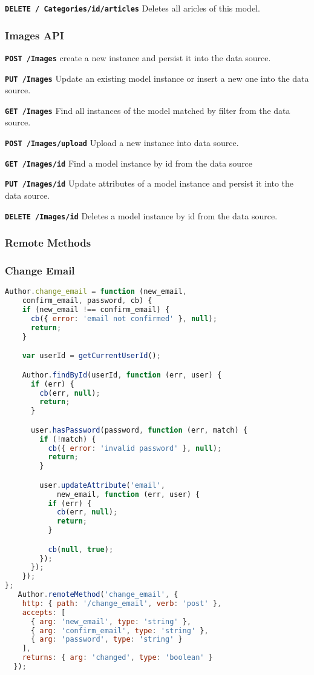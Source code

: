 \texttt{\textbf{DELETE / Categories/{id}/articles}} Deletes all aricles of this model.


\subsubsection{Images API}

\texttt{\textbf{POST /Images}} create a new instance and persist it into the data source.

\texttt{\textbf{PUT /Images}} Update an existing model instance or insert a new one into the data source.

\texttt{\textbf{GET /Images}} Find all instances of the model matched by filter from the data source.

\texttt{\textbf{POST /Images/upload}} Upload a new instance into data source.

\texttt{\textbf{GET /Images/{id}}} Find a model instance by id from the data source

\texttt{\textbf{PUT /Images/{id}}} Update attributes of a model instance and persist it into the data source.

\texttt{\textbf{DELETE /Images/{id}}} Deletes a model instance by id from the data source.

\subsubsection{Remote Methods}

\subsubsection{Change Email}

\begin{lstlisting}[language=javascript]
Author.change_email = function (new_email, 
	confirm_email, password, cb) {
    if (new_email !== confirm_email) {
      cb({ error: 'email not confirmed' }, null);
      return;
    }

    var userId = getCurrentUserId();  

    Author.findById(userId, function (err, user) {
      if (err) {
        cb(err, null);
        return;
      }

      user.hasPassword(password, function (err, match) {
        if (!match) {
          cb({ error: 'invalid password' }, null);
          return;
        }

        user.updateAttribute('email', 
        	new_email, function (err, user) {
          if (err) {
            cb(err, null);
            return;
          }

          cb(null, true);
        });
	  });       
	});
};
   Author.remoteMethod('change_email', {
    http: { path: '/change_email', verb: 'post' },
    accepts: [
      { arg: 'new_email', type: 'string' },
      { arg: 'confirm_email', type: 'string' },
      { arg: 'password', type: 'string' }
    ],
    returns: { arg: 'changed', type: 'boolean' }
  });
\end{lstlisting}

